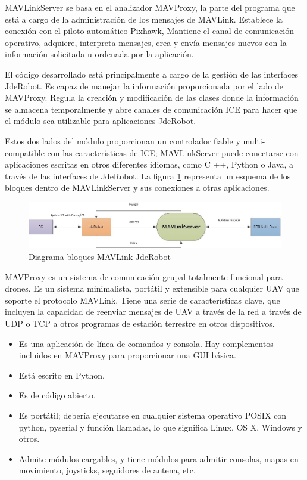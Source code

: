 MAVLinkServer se basa en el analizador MAVProxy, la parte del programa que está a cargo de la administración de los mensajes de MAVLink. Establece la conexión con el piloto automático Pixhawk, Mantiene el canal de comunicación operativo, adquiere, interpreta mensajes, crea y envía mensajes nuevos con la información solicitada u ordenada por la aplicación.

El código desarrollado está principalmente a cargo de la gestión de las interfaces JdeRobot. Es capaz de manejar la información proporcionada por el lado de MAVProxy. Regula la creación y modificación de las clases donde la información se almacena temporalmente y abre canales de comunicación ICE para hacer que el módulo sea utilizable para aplicaciones JdeRobot.

Estos dos lados del módulo proporcionan un controlador fiable y multi-compatible con las características de ICE; MAVLinkServer puede conectarse con aplicaciones escritas en otros diferentes idiomas, como C ++, Python o Java, a través de las interfaces de JdeRobot. La figura \ref{fig:mavLinkJdeRobotNegra} representa un esquema de los bloques dentro de MAVLinkServer y sus conexiones a otras aplicaciones.

\begin{figure}[H]
  \centering
  \includegraphics[scale=0.65]{imagenes/cajaNegra.jpg}
  \caption{Diagrama bloques MAVLink-JdeRobot}
  \label{fig:mavLinkJdeRobotNegra}
\end{figure}

MAVProxy es un sistema de comunicación grupal totalmente funcional  para drones. Es un sistema minimalista, portátil y extensible para cualquier UAV que soporte el protocolo MAVLink. Tiene una serie de características clave, que incluyen la capacidad de reenviar mensajes de UAV a través de la red a través de UDP o TCP a otros programas de estación terrestre en otros dispositivos.

\begin{itemize}
\item Es una aplicación de línea de comandos y consola. Hay complementos incluidos en MAVProxy para proporcionar una GUI básica.
\item Está escrito en Python.
\item Es de código abierto.
\item Es portátil; debería ejecutarse en cualquier sistema operativo POSIX con python, pyserial y función llamadas, lo que significa Linux, OS X, Windows y otros.
\item Admite módulos cargables, y tiene módulos para admitir consolas, mapas en movimiento, joysticks, seguidores de antena, etc.
\end{itemize}

